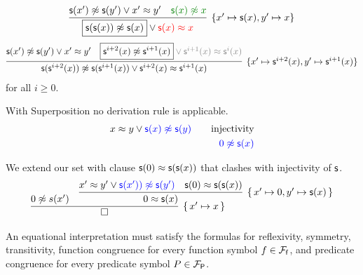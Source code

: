 	\begin{gather*}
	\infer[\{x'\mapsto \msucc (x), y'\mapsto x\}]{
		\boxed{\msucc (\msucc (x)) \mNE \msucc (x)} \lor\colLo \msucc (x)\mEQ x
	}{
		\msucc (x') \mNE \msucc (y') \lor x'\mEQ y' & \colHi\msucc (x) \mNE x
	}
	\end{gather*}
	\begin{gather*}
	\infer[\{x'\mapsto \msucc^{i+2} (x), y'\mapsto \msucc^{i+1} (x)\}]{
		\msucc (\msucc^{i+2} (x)) \mNE \msucc (\msucc^{i+1} (x)) \lor \msucc^{i+2} (x)\mEQ\msucc^{i+1} (x)
	}{
		\msucc (x') \mNE \msucc (y') \lor x'\mEQ y' & \boxed{\msucc^{i+2} (x) \mNE \msucc^{i+1} (x)}\colG \lor \msucc^{i+1} (x)\mEQ\msucc^{i}(x)
	}
	\end{gather*}
	for all $i\geq 0$.



\begin{example} With Superposition no derivation rule is applicable.
	\begin{align*}
	x \mEQ y \lor {\colN \msucc(x) \mNE \msucc(y)}
	\tag*{injectivity}\\
	{\colN 0 \mNE \msucc(x)}
	\end{align*}
\end{example}

\begin{example} We extend our set with clause ${\mathsf s}(0) \approx {\mathsf s}({\mathsf s}(x))$ 
	that clashes with injectivity of ${\mathsf s}$.
	\begin{gather*}
	\infer[\{\,x'\mapsto x\,\}]
	{\square}
	{0\mNE s(x') &
	\infer[
	\{\, x'\mapsto 0, y'\mapsto\msucc(x) \,\}
	]{
		0 \mEQ \msucc(x)	
	}{
		x' \mEQ y' \lor {\colN \msucc(x')) \mNE \msucc(y')} 
		& {\msucc(0) \mEQ \msucc(\msucc(x))}
	}
}
	\end{gather*}
\end{example}


	An equational interpretation must satisfy the formulas for reflexivity, symmetry, transitivity, 
	function congruence for every function symbol $f\in{{\mathcal F}_{\mathsf f}}$, 
	and predicate congruence for every predicate symbol $P\in{{\mathcal F}_{\mathsf P}}$.

%

